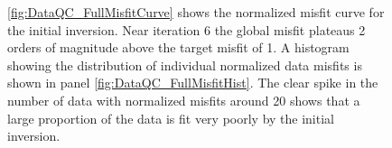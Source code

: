\documentclass[final,authoryear,5p,times,twocolumn]{elsarticle}
\begin{document}
\begin{figure} [!ht]
    \begin{center}
    \end{center}
\caption{\ref{fig:DataQC_FullMisfitCurve} shows the normalized misfit curve for the initial inversion. Near iteration 6 the global misfit plateaus 2 orders of magnitude above the target misfit of 1. A histogram showing the distribution of individual normalized data misfits is shown in panel \ref{fig:DataQC_FullMisfitHist}. The clear spike in the number of data with normalized misfits around 20 shows that a large proportion of the data is fit very poorly by the initial inversion.} 
\label{fig:DataQC_FullMisfit}
\end{figure}
\end{document}
